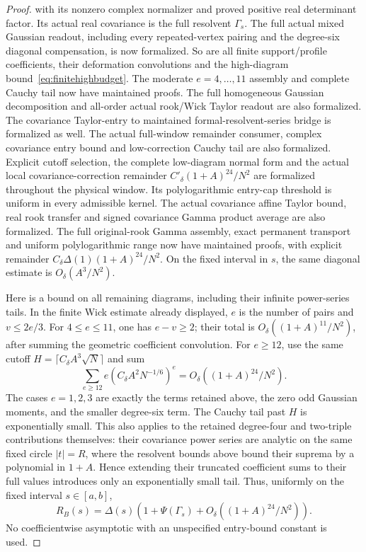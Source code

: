 \begin{proof}
with its nonzero complex normalizer and proved positive real determinant
factor. Its actual real covariance is the full resolvent \(\Gamma_s\).
The full actual mixed Gaussian readout, including every repeated-vertex
pairing and the degree-six diagonal compensation, is now formalized.
So are all finite support/profile coefficients, their deformation
convolutions and the high-diagram bound~\eqref{eq:finitehighbudget}.
The moderate \(e=4,\ldots,11\) assembly and complete Cauchy tail now
have maintained proofs. The full homogeneous Gaussian decomposition and
all-order actual rook/Wick Taylor readout are also formalized. The covariance
Taylor-entry to maintained formal-resolvent-series bridge is formalized as
well. The actual full-window remainder consumer, complex covariance entry
bound and low-correction Cauchy tail are also formalized. Explicit cutoff
selection, the complete low-diagram normal form and the actual local
covariance-correction remainder \(C'_\delta(1+A)^{24}/N^2\) are formalized
throughout the physical window. Its polylogarithmic entry-cap threshold is
uniform in every admissible kernel. The actual covariance affine Taylor
bound, real rook transfer and signed covariance Gamma product average are
also formalized. The full original-rook Gamma assembly, exact permanent
transport and uniform polylogarithmic range now have maintained proofs,
with explicit remainder \(C_\delta\Delta(1)(1+A)^{24}/N^2\).
On the fixed interval in \(s\),
the same diagonal estimate is \(O_\delta(A^3/N^2)\).

Here is a bound on all remaining diagrams, including their
infinite power-series tails.
In the finite Wick estimate already displayed, \(e\) is the
number of pairs and \(v\leq2e/3\).
For \(4\leq e\leq11\), one has \(e-v\geq2\);
their total is \(O_\delta((1+A)^{11}/N^2)\), after summing
the geometric coefficient convolution.
For \(e\geq12\), use the same cutoff
\(H=\lceil C_\delta A^3\sqrt N\rceil\) and sum
\[
 \sum_{e\geq12}e(C_\delta A^2N^{-1/6})^e
                    =O_\delta((1+A)^{24}/N^2).
\]
The cases \(e=1,2,3\) are exactly the terms retained above,
the zero odd Gaussian moments, and the smaller degree-six term.
The Cauchy tail past \(H\) is exponentially small.
This also applies to the retained degree-four and two-triple
contributions themselves: their covariance power series are
analytic on the same fixed circle \(|t|=R\), where the
resolvent bounds above bound their suprema by a polynomial
in \(1+A\). Hence extending their truncated coefficient sums
to their full values introduces only an exponentially small tail.
Thus, uniformly on the fixed interval \(s\in[a,b]\),
\[
 R_B(s)=\Delta(s)
        \left(1+\Psi(\Gamma_s)
                  +O_\delta((1+A)^{24}/N^2)\right).
\]
No coefficientwise asymptotic with an unspecified entry-bound
constant is used.


\end{proof}
